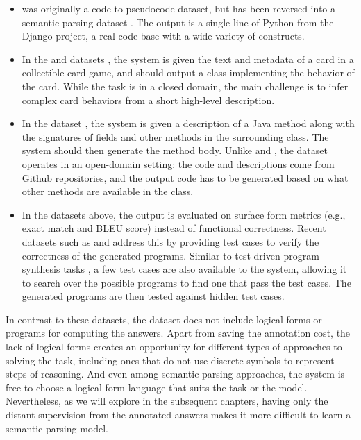 \begin{itemize}

\item {} \cite{oda2015learning}
was originally a code-to-pseudocode dataset,
but has been reversed into a semantic parsing dataset \cite{ling2016latent}.
The output is a single line of Python from the Django project,
a real code base with a wide variety of constructs.

\item In the  and  datasets \cite{ling2016latent},
the system is given the text and metadata of a card in a
collectible card game, and should output a class implementing the behavior
of the card.
While the task is in a closed domain,
the main challenge is to infer complex card behaviors
from a short high-level description.

\item In the  dataset \cite{iyer2018mapping},
the system is given a description of a Java method
along with the signatures of fields
and other methods in the surrounding class.
The system should then generate the method body.
Unlike  and ,
the  dataset operates in an open-domain setting:
the code and descriptions come from Github repositories,
and the output code has to be generated
based on what other methods are available in the class.

\item 
In the datasets above, the output is evaluated
on surface form metrics
(e.g., exact match and BLEU score)
instead of functional correctness.
Recent datasets such as
 \cite{polosukhin2018neural}
and  \cite{zavershynskyi2018naps}
address this by providing test cases to verify the correctness of
the generated programs.
Similar to test-driven program synthesis tasks
\cite{gulwani2011automating,devlin2017robustfill,shi2019frangel},
a few test cases are also available to the system,
allowing it to search over the possible programs
to find one that pass the test cases.
The generated programs are then tested against hidden test cases.

\end{itemize}

In contrast to these datasets,
the \wtq dataset does not include logical forms or programs
for computing the answers.
Apart from saving the annotation cost,
the lack of logical forms creates an opportunity for
different types of approaches to solving the task,
including ones that do not use discrete symbols
to represent steps of reasoning.
And even among semantic parsing approaches,
the system is free to choose a logical form language
that suits the task or the model.
Nevertheless, as we will explore in the subsequent chapters,
having only the distant supervision from the annotated answers
makes it more difficult to learn a semantic parsing model.

